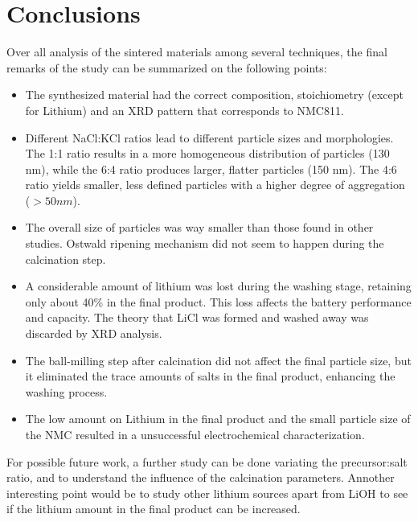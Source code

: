 \documentclass{article}
\begin{document}
\section{Conclusions}
Over all analysis of the sintered materials among several techniques, the 
final remarks of the study can be summarized on the following points: \\
\begin{itemize}
  \item The synthesized material had the correct composition, stoichiometry (except for Lithium) and an XRD pattern that corresponds to NMC811.
  \item Different NaCl:KCl ratios lead to different particle sizes and morphologies. 
  The 1:1 ratio results in a more homogeneous distribution of particles (130 nm),
   while the 6:4 ratio produces larger, flatter particles (150 nm). The 4:6 ratio yields smaller,
    less defined particles with a higher degree of aggregation (\(>50nm\)).
  \item The overall size of particles was way smaller than those found in other studies. Ostwald ripening mechanism did not seem to happen during the calcination step.
  \item A considerable amount of lithium was lost during the washing stage, retaining only about 40\%
  in the final product. This loss affects the battery performance and capacity. The theory that LiCl was formed and washed away was discarded by XRD analysis.
  \item The ball-milling step after calcination did not affect the final particle size, 
  but it eliminated the trace amounts of salts in the final product, enhancing the washing process. 
  \item The low amount on Lithium in the final product and the small particle size of the NMC resulted in a unsuccessful electrochemical characterization.  
\end{itemize}
For possible future work, a further study can be done variating the precursor:salt ratio, and to understand the influence of the 
calcination parameters. Annother interesting point would be to study other lithium sources apart from LiOH to see if the lithium amount in the final product can be increased.\\
\end{document}
